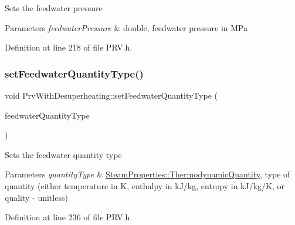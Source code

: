 Sets the feedwater pressure


\begin{DoxyParams}{Parameters}
{\em feedwater\+Pressure} & double, feedwater pressure in M\+Pa \\
\hline
\end{DoxyParams}


Definition at line 218 of file P\+R\+V.\+h.

\mbox{\label{class_prv_with_desuperheating_a3efaf028d1e6b8349a9e064605cc8d7a}} 
\subsubsection{\texorpdfstring{set\+Feedwater\+Quantity\+Type()}{setFeedwaterQuantityType()}\hspace{0.1cm}{\footnotesize\ttfamily [1/3]}}
{\footnotesize\ttfamily void Prv\+With\+Desuperheating\+::set\+Feedwater\+Quantity\+Type (\begin{DoxyParamCaption}\item[{\hyperlink{class_steam_properties_ae0294bedf7d178c2d8fb6aed0f62fbff}{Steam\+Properties\+::\+Thermodynamic\+Quantity}}]{feedwater\+Quantity\+Type }\end{DoxyParamCaption})\hspace{0.3cm}{\ttfamily [inline]}}

Sets the feedwater quantity type


\begin{DoxyParams}{Parameters}
{\em quantity\+Type} & \hyperlink{class_steam_properties_ae0294bedf7d178c2d8fb6aed0f62fbff}{Steam\+Properties\+::\+Thermodynamic\+Quantity}, type of quantity (either temperature in K, enthalpy in k\+J/kg, entropy in k\+J/kg/K, or quality -\/ unitless) \\
\hline
\end{DoxyParams}


Definition at line 236 of file P\+R\+V.\+h.

\mbox{\label{class_prv_with_desuperheating_a3efaf028d1e6b8349a9e064605cc8d7a}} 
